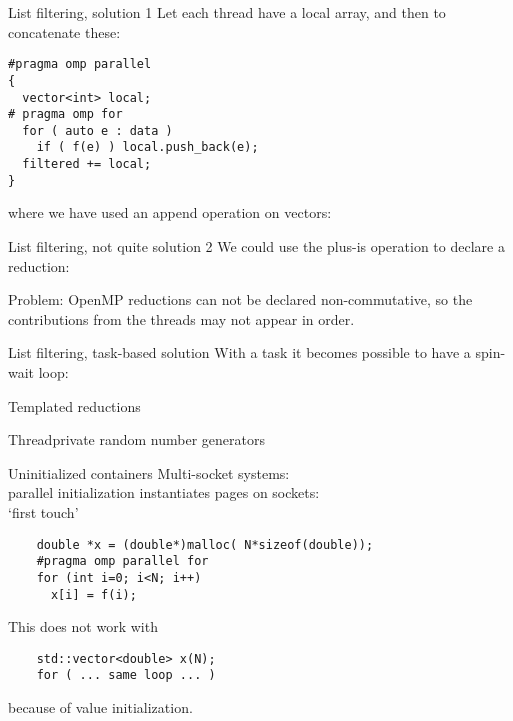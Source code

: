 \documentclass[11pt,headernav]{beamer}
\begin{document}
\begin{numberedframe}{List filtering, solution 1}
  Let each thread have a local array,
  and then to concatenate these:
\begin{lstlisting}
#pragma omp parallel
{
  vector<int> local;
# pragma omp for
  for ( auto e : data )
    if ( f(e) ) local.push_back(e);
  filtered += local;
}
\end{lstlisting}
where we have used an append operation on vectors:
\end{numberedframe}

\begin{numberedframe}{List filtering, not quite solution 2}
We could use the plus-is operation to declare a reduction:

Problem: OpenMP reductions can not be declared non-commutative,
so the contributions from the threads
may not appear in order.

\end{numberedframe}

\begin{numberedframe}{List filtering, task-based solution}
With a task it becomes possible to have a spin-wait loop:
\end{numberedframe}

\begin{numberedframe}{Templated reductions}
  
\end{numberedframe}


\begin{numberedframe}{Threadprivate random number generators}
  
\end{numberedframe}

\begin{numberedframe}{Uninitialized containers}
  Multi-socket systems:\\
  parallel initialization instantiates pages on sockets:\\
  `first touch'
  \begin{lstlisting}
    double *x = (double*)malloc( N*sizeof(double));
    #pragma omp parallel for
    for (int i=0; i<N; i++)
      x[i] = f(i);
  \end{lstlisting}
  This does not work with
  \begin{lstlisting}
    std::vector<double> x(N);
    for ( ... same loop ... )
  \end{lstlisting}
  because of value initialization.
\end{numberedframe}
\end{document}

